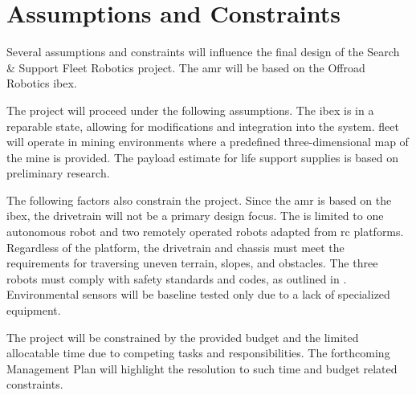 \section{Assumptions and Constraints}
\label{sec:assumptions_constraints}

Several assumptions and constraints will influence the final design of the Search \& Support Fleet Robotics project. The \gls{amr} will be based on the Offroad Robotics \gls{ibex}.

The project will proceed under the following assumptions. The \gls{ibex} is in a reparable state, allowing for modifications and integration into the system. \gls{fleet} will operate in mining environments where a predefined three-dimensional map of the mine is provided. The \gls{payload} estimate for life support supplies is based on preliminary research. 

The following factors also constrain the project. Since the \gls{amr} is based on the \gls{ibex}, the drivetrain will not be a primary design focus. The  is limited to one autonomous robot and two remotely operated robots adapted from \gls{rc} platforms. Regardless of the platform, the drivetrain and chassis must meet the requirements for traversing uneven terrain, slopes, and obstacles. The three robots must comply with safety standards and codes, as outlined in . Environmental sensors will be baseline tested only due to a lack of specialized equipment. 

The project will be constrained by the provided budget and the limited allocatable time due to competing tasks and responsibilities. The forthcoming Management Plan will highlight the resolution to such time and budget related constraints.

